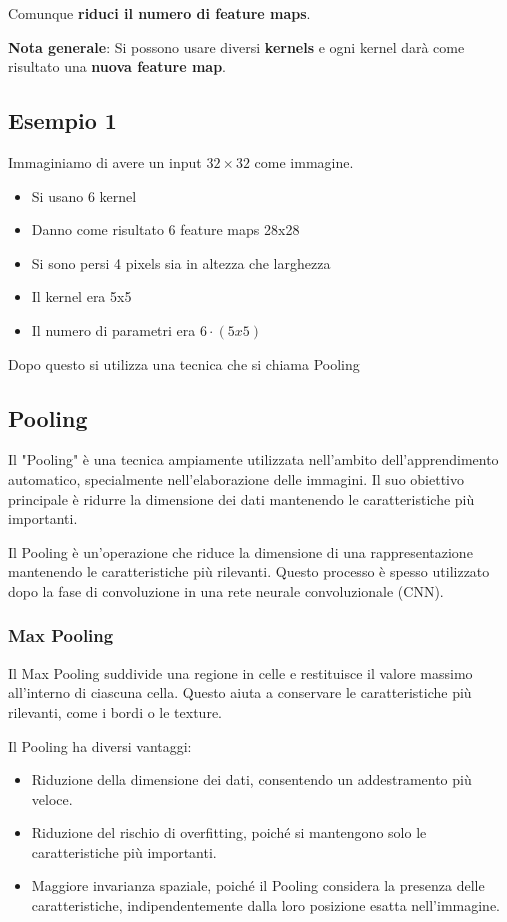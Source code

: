 Comunque \textbf{riduci il numero di feature maps}.

\textbf{Nota generale}: Si possono usare diversi \textbf{kernels} e ogni kernel darà come risultato una \textbf{nuova feature map}.

\subsection{Esempio 1}

Immaginiamo di avere un input $32 \times 32$ come immagine.

\begin{itemize}
    \item Si usano 6 kernel
    \item Danno come risultato 6 feature maps 28x28
    \item Si sono persi 4 pixels sia in altezza che larghezza
    \item Il kernel era 5x5
    \item Il numero di parametri era $6 \cdot (5x5)$
\end{itemize}

Dopo questo si utilizza una tecnica che si chiama Pooling

\subsection{Pooling}

Il "Pooling" è una tecnica ampiamente utilizzata nell'ambito dell'apprendimento
automatico, specialmente nell'elaborazione delle immagini. Il suo obiettivo
principale è ridurre la dimensione dei dati mantenendo le caratteristiche più
importanti.

Il Pooling è un'operazione che riduce la dimensione di una rappresentazione
mantenendo le caratteristiche più rilevanti. Questo processo è spesso
utilizzato dopo la fase di convoluzione in una rete neurale convoluzionale
(CNN).

\subsubsection{Max Pooling}
Il Max Pooling suddivide una regione in celle e restituisce il valore massimo
all'interno di ciascuna cella. Questo aiuta a conservare le caratteristiche più
rilevanti, come i bordi o le texture.

Il Pooling ha diversi vantaggi:

\begin{itemize}
    \item Riduzione della dimensione dei dati, consentendo un addestramento più veloce.
    \item Riduzione del rischio di overfitting, poiché si mantengono solo le
          caratteristiche più importanti.
    \item Maggiore invarianza spaziale, poiché il Pooling considera la presenza delle
          caratteristiche, indipendentemente dalla loro posizione esatta nell'immagine.
\end{itemize}

